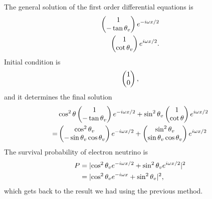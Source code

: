 \documentclass[letterpaper,12pt,english]{sphinxmanual}
\begin{document}
The general solution of the first order differential equations is
\begin{gather}
\begin{split}\begin{pmatrix}
1 \\ -\tan\theta_v
\end{pmatrix} e^{-i \omega x/ 2 } \\
\begin{pmatrix}
1 \\ \cot \theta_v
\end{pmatrix} e^{i  \omega x/ 2 }.\end{split}\notag
\end{gather}
Initial condition is
\begin{gather}
\begin{split}\begin{pmatrix}
1 \\ 0
\end{pmatrix},\end{split}\notag
\end{gather}
and it determines the final solution
\begin{gather}
\begin{split}& \cos^2\theta \begin{pmatrix}
1 \\ -\tan\theta_v
\end{pmatrix} e^{-i \omega x/ 2 } + \sin^2\theta_v
\begin{pmatrix}
1 \\ \cot \theta
\end{pmatrix} e^{i  \omega x/ 2 } \\
= & \begin{pmatrix}
\cos^2\theta_v \\ -\sin\theta_v \cos\theta_v
\end{pmatrix} e^{-i \omega x/ 2 } +
\begin{pmatrix}
\sin^2\theta_v \\ \sin\theta_v \cos \theta_v
\end{pmatrix} e^{i  \omega x/ 2 }\end{split}\notag
\end{gather}
The survival probability of electron neutrino is
\begin{gather}
\begin{split}P &= \lvert \cos^2\theta_v e^{-i \omega x/2} + \sin^2\theta_v e^{i\omega x/2} \rvert^2 \\
& = \lvert \cos^2 \theta_v e^{-i \omega x} + \sin^2 \theta_v \rvert ^2 ,\end{split}\notag
\end{gather}
which gets back to the result we had using the previous method.
\end{document}
